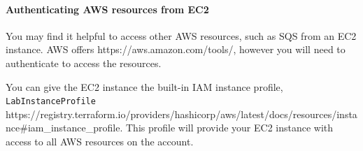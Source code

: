 \documentclass{csse4400}
\begin{document}




\paragraph{Authenticating AWS resources from EC2}
You may find it helpful to access other AWS resources,
such as SQS from an EC2 instance.
AWS offers %
{https://aws.amazon.com/tools/},
however you will need to authenticate to access the resources.

You can give the EC2 instance the built-in IAM instance profile,
\texttt{LabInstanceProfile} %
{https://registry.terraform.io/providers/hashicorp/aws/latest/docs/resources/instance\#iam_instance_profile}.
This profile will provide your EC2 instance with access to all AWS resources on the account.

\end{document}
